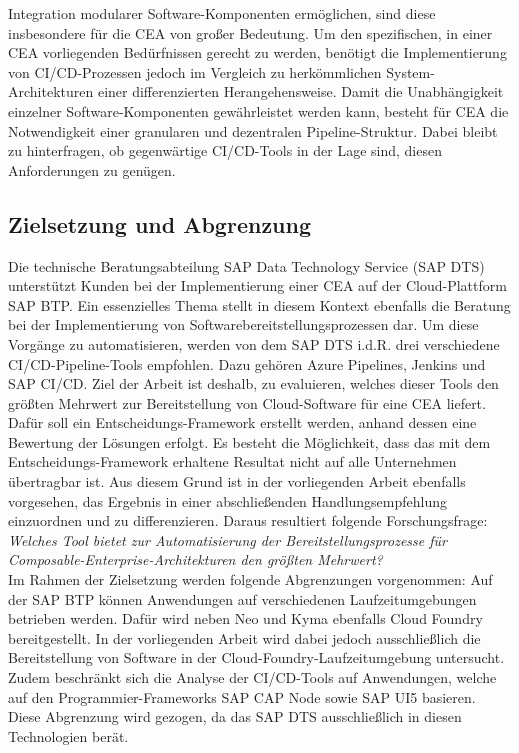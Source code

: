 Integration modularer Software-Komponenten ermöglichen, sind diese insbesondere für die CEA von großer Bedeutung. Um den spezifischen, in einer CEA vorliegenden Bedürfnissen gerecht zu werden, benötigt die Implementierung von CI/CD-Prozessen jedoch im Vergleich zu herkömmlichen System-Architekturen einer differenzierten Herangehensweise. Damit die Unabhängigkeit einzelner Software-Komponenten gewährleistet werden kann, besteht für CEA die Notwendigkeit einer granularen und dezentralen Pipeline-Struktur. Dabei bleibt zu hinterfragen, ob gegenwärtige CI/CD-Tools in der Lage sind, diesen Anforderungen zu genügen.


\subsection{Zielsetzung und Abgrenzung}
Die technische Beratungsabteilung SAP Data Technology Service (\acs{SAP DTS}) unterstützt Kunden bei der Implementierung einer CEA auf der Cloud-Plattform \ac{SAP BTP}. 
Ein essenzielles Thema stellt in diesem Kontext ebenfalls die Beratung bei der Implementierung von Softwarebereitstellungsprozessen dar. Um diese Vorgänge zu automatisieren, werden von dem SAP DTS i.d.R. drei verschiedene CI/CD-Pipeline-Tools empfohlen. Dazu gehören Azure Pipelines, Jenkins und  \acs{SAP CI/CD}. Ziel der Arbeit ist deshalb, zu evaluieren, welches dieser Tools den größten Mehrwert zur Bereitstellung von Cloud-Software für eine CEA liefert. Dafür soll ein Entscheidungs-Framework erstellt werden, anhand dessen eine Bewertung der Lösungen erfolgt. Es besteht die Möglichkeit, dass das mit dem Entscheidungs-Framework erhaltene Resultat nicht auf alle Unternehmen übertragbar ist. Aus diesem Grund ist in der vorliegenden Arbeit ebenfalls vorgesehen, das Ergebnis in einer abschließenden Handlungsempfehlung einzuordnen und zu differenzieren. Daraus resultiert folgende Forschungsfrage:\\
\textit{Welches Tool bietet zur Automatisierung der Bereitstellungsprozesse für Composable-\-Enterprise-Architekturen den größten Mehrwert?}\\
Im Rahmen der Zielsetzung werden folgende Abgrenzungen vorgenommen: Auf der SAP BTP können Anwendungen auf verschiedenen Laufzeitumgebungen betrieben werden. Dafür wird neben Neo und Kyma ebenfalls Cloud Foundry bereitgestellt. In der vorliegenden Arbeit wird dabei jedoch ausschließlich die Bereitstellung von Software in der Cloud-Foundry-Laufzeitumgebung untersucht. Zudem beschränkt sich die Analyse der CI/CD-Tools auf Anwendungen, welche auf den Programmier-Frameworks SAP CAP Node sowie SAP UI5 basieren. Diese Abgrenzung wird gezogen, da das SAP DTS ausschließlich in diesen Technologien berät.  

